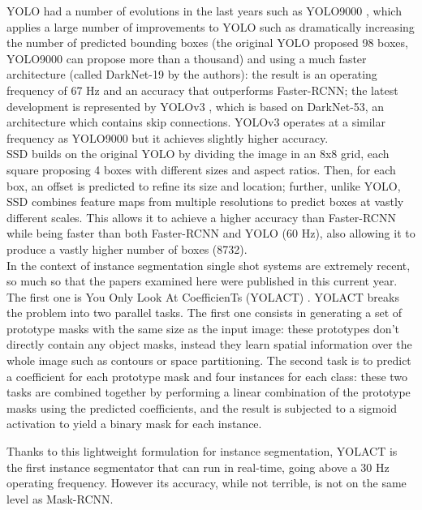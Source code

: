 \documentclass[12pt,twoside]{report}
\begin{document}
YOLO had a number of evolutions in the last years such as YOLO9000 \cite{yolo9000}, which applies a large number of improvements to YOLO such as dramatically increasing the number of predicted bounding boxes (the original YOLO proposed 98 boxes, YOLO9000 can propose more than a thousand) and using a much faster architecture (called DarkNet-19 by the authors): the result is an operating frequency of 67 Hz and an accuracy that outperforms Faster-RCNN; the latest development is represented by YOLOv3 \cite{yolov3}, which is based on DarkNet-53, an architecture which contains skip connections. YOLOv3 operates at a similar frequency as YOLO9000 but it achieves slightly higher accuracy. 
\\

SSD \cite{ssd} builds on the original YOLO by dividing the image in an 8x8 grid, each square proposing 4 boxes with different sizes and aspect ratios. Then, for each box, an offset is predicted to refine its size and location; further, unlike YOLO, SSD combines feature maps from multiple resolutions to predict boxes at vastly different scales. This allows it to achieve a higher accuracy than Faster-RCNN while being faster than both Faster-RCNN and YOLO (60 Hz), also allowing it to produce a vastly higher number of boxes (8732).
\\

In the context of instance segmentation single shot systems are extremely recent, so much so that the papers examined here were published in this current year. The first one is You Only Look At CoefficienTs (YOLACT) \cite{yolact}. YOLACT breaks the problem into two parallel tasks. The first one consists in generating a set of prototype masks with the same size as the input image: these prototypes don't directly contain any object masks, instead they learn spatial information over the whole image such as contours or space partitioning. The second task is to predict a coefficient for each prototype mask and four instances for each class: these two tasks are combined together by performing a linear combination of the prototype masks using the predicted coefficients, and the result is subjected to a sigmoid activation to yield a binary mask for each instance.

Thanks to this lightweight formulation for instance segmentation, YOLACT is the first instance segmentator that can run in real-time, going above a 30 Hz operating frequency. However its accuracy, while not terrible, is not on the same level as Mask-RCNN.
\\
\end{document}
